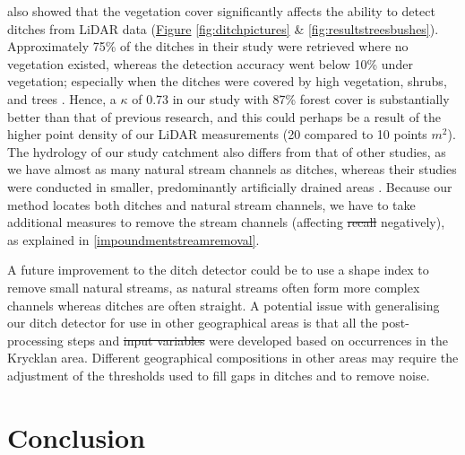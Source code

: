 \documentclass[11pt, review]{elsarticle} %
\providecommand{\DIFaddtex}[1]{{\protect\color{blue}\uwave{#1}}} %
\providecommand{\DIFdeltex}[1]{{\protect\color{red}\sout{#1}}}                      %
\providecommand{\DIFaddbegin}{} %
\providecommand{\DIFaddend}{} %
\providecommand{\DIFdelbegin}{} %
\providecommand{\DIFdelend}{} %
\providecommand{\DIFadd}[1]{\texorpdfstring{\DIFaddtex{#1}}{#1}} %
\providecommand{\DIFdel}[1]{\texorpdfstring{\DIFdeltex{#1}}{}} %
\begin{document}
\citet{bailly} also showed that the vegetation cover significantly affects the ability to detect ditches from LiDAR data (\hyperref[fig:ditchpictures]{Figure} \ref{fig:ditchpictures} \& \ref{fig:resultstreesbushes}). Approximately 75\% of the ditches in their study were retrieved where no vegetation existed, whereas the detection accuracy went below 10\% under vegetation; especially when the ditches were covered by high vegetation, shrubs, and trees \citep{bailly}. Hence, a $\kappa$ of 0.73 in our study  with  87\% forest cover \citep{krycklancatchment} is substantially better than that of previous research, and this could perhaps be a result of the higher point density of our LiDAR measurements (20 compared to 10 points $m^{2}$). The hydrology of our study catchment also differs from that of other studies, as we have almost as many natural stream channels as ditches, whereas their studies were conducted in smaller, predominantly artificially drained areas \citep{bailly, roelens, rapinel}. Because our method locates both ditches and natural stream channels, we have to take additional measures to remove the stream channels (affecting \DIFdelbegin \DIFdel{recall }\DIFdelend \DIFaddbegin \DIFadd{ditch detection }\DIFaddend negatively), as explained in \ref{impoundmentstreamremoval}.

A future improvement to the ditch detector could be to use a shape index to remove small natural streams, as natural streams often form more complex channels whereas ditches are often straight. A potential issue with generalising our ditch detector for use in other geographical areas is that all the post-processing steps and \DIFdelbegin \DIFdel{input variables }\DIFdelend \DIFaddbegin \DIFadd{features }\DIFaddend were developed based on occurrences in the Krycklan area. Different geographical compositions in other areas may require the adjustment of the thresholds used to fill gaps in ditches and to remove noise.

\section{Conclusion}
\end{document}
